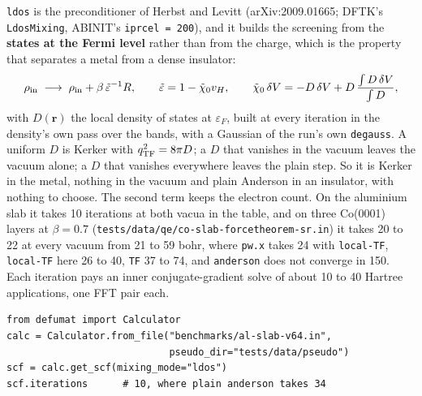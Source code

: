 \documentclass[11pt,a4paper]{article}
\newcommand{\code}[1]{\texttt{\small #1}}
\begin{document}
\code{ldos} is the preconditioner of Herbst and Levitt (arXiv:2009.01665; DFTK's
\code{LdosMixing}, ABINIT's \code{iprcel = 200}), and it builds the screening from the
\textbf{states at the Fermi level} rather than from the charge, which is the property
that separates a metal from a dense insulator:
\begin{equation*}
  \rho_{\rm in} \;\longrightarrow\; \rho_{\rm in} + \beta\,\tilde\varepsilon^{-1} R,
  \qquad
  \tilde\varepsilon = 1 - \tilde\chi_0 v_H,
  \qquad
  \tilde\chi_0\,\delta V = -D\,\delta V + D\,\frac{\int D\,\delta V}{\int D},
\end{equation*}
with $D(\mathbf r)$ the local density of states at $\varepsilon_F$, built at every
iteration in the density's own pass over the bands, with a Gaussian of the run's own
\code{degauss}. A uniform $D$ is Kerker with $q_{\rm TF}^2 = 8\pi D$; a $D$ that vanishes
in the vacuum leaves the vacuum alone; a $D$ that vanishes everywhere leaves the plain
step. So it is Kerker in the metal, nothing in the vacuum and plain Anderson in an
insulator, with nothing to choose. The second term keeps the electron count. On the
aluminium slab it takes 10 iterations at both vacua in the table, and on three Co(0001)
layers at $\beta = 0.7$ (\code{tests/data/qe/co-slab-forcetheorem-sr.in}) it takes 20
to 22 at every vacuum from 21 to 59 bohr, where \code{pw.x} takes 24 with \code{local-TF},
\code{local-TF} here 26 to 40, \code{TF} 37 to 74, and \code{anderson} does not converge
in 150. Each iteration pays an inner conjugate-gradient solve of about 10 to 40 Hartree
applications, one FFT pair each.
\begin{verbatim}
from defumat import Calculator
calc = Calculator.from_file("benchmarks/al-slab-v64.in",
                            pseudo_dir="tests/data/pseudo")
scf = calc.get_scf(mixing_mode="ldos")
scf.iterations      # 10, where plain anderson takes 34
\end{verbatim}
\end{document}
